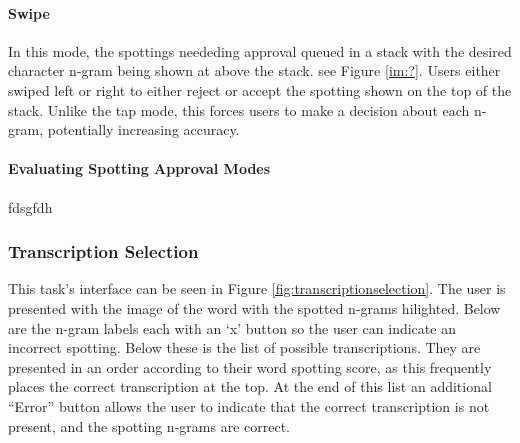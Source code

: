 \documentclass[ms,electronic,twosidetoc,letterpaper,chaptercenter,parttop,lof,lot]{byumsphd}
\begin{document}
\paragraph{Swipe}
In this mode, the spottings neededing approval queued in a stack with the desired character n-gram being shown at above the stack. see Figure \ref{im:?}. Users either swiped left or right to either reject or accept the spotting shown on the top of the stack. Unlike the tap mode, this forces users to make a decision about each n-gram, potentially increasing accuracy.


\paragraph{Evaluating Spotting Approval Modes}

fdsgfdh
\fi

\subsubsection{Transcription Selection}\label{transtask}
This task's interface can be seen in Figure \ref{fig:transcriptionselection}.
The user is presented with the image of the word with the spotted n-grams hilighted. Below are the n-gram labels each with an `x' button so the user can indicate an incorrect spotting.
Below these is the list of possible transcriptions. They are presented in an order according to their word spotting score, as this frequently places the correct transcription at the top.
At the end of this list an additional ``Error'' button allows the user to indicate that the correct transcription is not present, and the spotting n-grams are correct.
\end{document}
